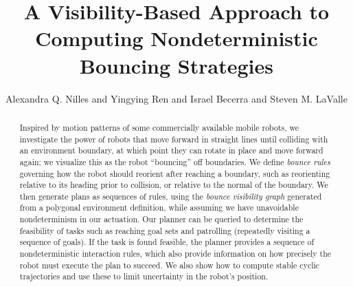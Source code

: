 \documentclass[sageh,times,Review]{sagej}
\begin{document}

\title{A Visibility-Based Approach to Computing Nondeterministic Bouncing Strategies}

\author{Alexandra Q. Nilles and
Yingying Ren and
Israel Becerra and
Steven M. LaValle}




\begin{abstract}
Inspired by motion patterns of some commercially available mobile robots, we
investigate the power of robots that move forward in straight lines until
colliding with an environment boundary, at which point they can rotate in place
and move forward again; we visualize this as the robot ``bouncing'' off
boundaries. We define {\em bounce rules} governing how the robot should reorient
after reaching a boundary, such as reorienting relative to its heading prior to 
collision, or relative to the normal of the boundary. We then generate plans as sequences of rules, using the
{\em bounce visibility graph} generated from a polygonal environment definition,
while assuming we have unavoidable nondeterminism in our actuation. Our planner
can be queried to determine the feasibility of tasks such as reaching goal sets
and patrolling (repeatedly visiting a sequence of goals). If the task is
found feasible, the planner provides a sequence of nondeterministic interaction rules,
which also provide information on how precisely the robot must execute the plan
to succeed. We also show how to compute stable cyclic trajectories and use these
to limit uncertainty in the robot's position.
\end{abstract}


\maketitle
\end{document}
